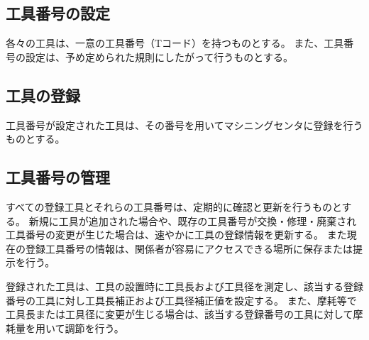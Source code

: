 



\subsection{工具番号の設定}
各々の工具は、一意の工具番号（Tコード）を持つものとする。
また、工具番号の設定は、予め定められた規則にしたがって行うものとする。

\subsection{工具の登録}
工具番号が設定された工具は、その番号を用いてマシニングセンタに登録を行うものとする。

\subsection{工具番号の管理}
すべての登録工具とそれらの工具番号は、定期的に確認と更新を行うものとする。
新規に工具が追加された場合や、既存の工具番号が交換・修理・廃棄され工具番号の変更が生じた場合は、速やかに工具の登録情報を更新する。
また現在の登録工具番号の情報は、関係者が容易にアクセスできる場所に保存または提示を行う。


登録された工具は、工具の設置時に工具長および工具径を測定し、該当する登録番号の工具に対し工具長補正および工具径補正値を設定する。
また、摩耗等で工具長または工具径に変更が生じる場合は、該当する登録番号の工具に対して摩耗量を用いて調節を行う。



